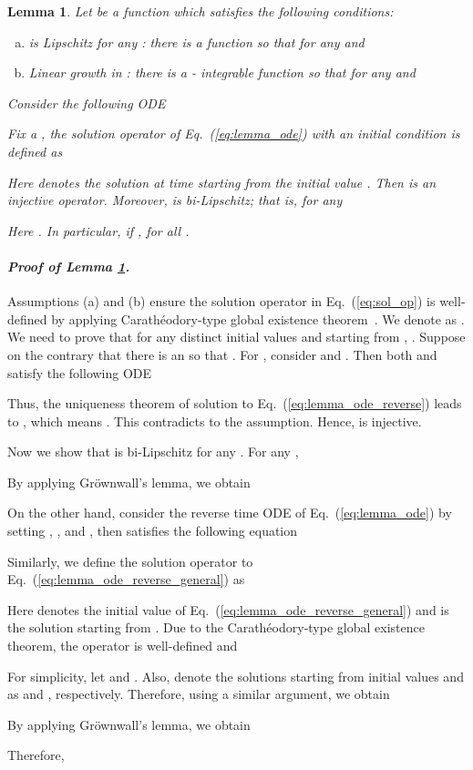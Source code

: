 \documentclass{article} \usepackage{iclr2024_coNFErence,times}
\def\eqref#1{equation~\ref{#1}}
\newenvironment{myproof}[2]{\paragraph{\textit{Proof of {#1} {#2}. }}}{\hfill}
\def\eqref#1{(\ref{#1})}
\def\eqref#1{(\ref{#1})}
\newtheorem{lemma}[theorem]{Lemma}
\theoremstyle{definition}
\theoremstyle{remark}
\begin{document}
\begin{lemma}\label{th:injective_sol_op}
    Let  be a function which satisfies the following conditions:
    \begin{enumerate}[(a)]
        \item  is Lipschitz for any : there is a function  so that for any  and 
        
        \item Linear growth in : there is a - integrable function  so that for any  and 
                
    \end{enumerate}
    Consider the following ODE 
    
   Fix a , the solution operator  of Eq.~\eqref{eq:lemma_ode} with an initial condition  is defined as
   
   Here  denotes the solution at time  starting from the initial value .
   Then  is an injective operator. Moreover,  is bi-Lipschitz; that is, for any 
   
   Here .
   In particular, if ,  for all .
\end{lemma}
\begin{myproof}{Lemma}{\ref{th:injective_sol_op}}

    Assumptions (a) and (b) ensure the solution operator in Eq.~\eqref{eq:sol_op} is well-defined by applying Carath\'eodory-type global existence theorem~\citep{reid1971ordinary}. We denote  as .
    We need to prove that for any distinct initial values  and  starting from ,  . Suppose on the contrary that there is an  so that . For , consider 
     and .
    Then both  and  satisfy the following ODE
    
    Thus, the uniqueness theorem of solution to Eq.~\eqref{eq:lemma_ode_reverse} leads to , which means . This contradicts to the assumption. Hence,  is injective. 

    
    Now we show that  is bi-Lipschitz for any . For any ,
    
    By applying Gr\"ownwall's lemma, we obtain 
    
    On the other hand, consider the reverse time ODE of Eq.~\eqref{eq:lemma_ode} by setting , 
    , and , then  satisfies the following equation
    
    Similarly, we define the solution operator to Eq.~\eqref{eq:lemma_ode_reverse_general} as 
       
    Here  denotes the initial value of Eq.~\eqref{eq:lemma_ode_reverse_general} and  is the solution starting from . Due to the Carath\'eodory-type global existence theorem, the operator  is well-defined and 
    
    For simplicity, let  and . Also, denote the solutions starting from initial values  and  as  and  , respectively.
    Therefore, using a similar argument, we obtain
        
    By applying Gr\"ownwall's lemma, we obtain 
            
    Therefore, 
       
\end{myproof}
\end{document}
